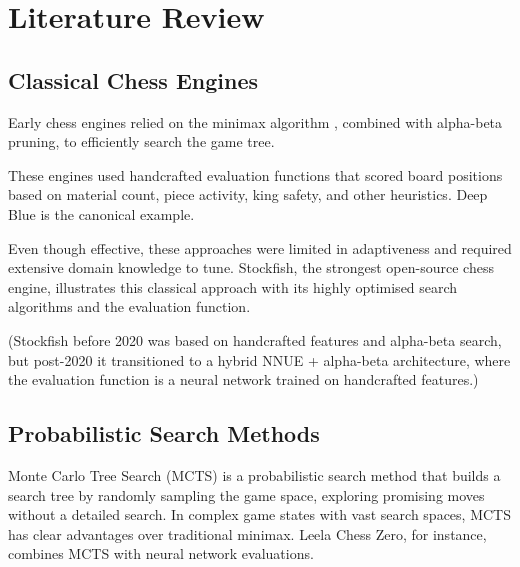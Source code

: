 \chapter{Literature Review}

\section{Classical Chess Engines}

Early chess engines relied on the minimax algorithm \cite{calderan_minimax_chess}, combined with alpha-beta pruning, to efficiently search the game tree.

These engines used handcrafted evaluation functions that scored board positions based on material count, piece activity, king safety, and other heuristics. Deep Blue \cite{deep_blue_paper} is the canonical example.

Even though effective, these approaches were limited in adaptiveness and required extensive domain knowledge to tune. Stockfish, the strongest open-source chess engine, illustrates this classical approach with its highly optimised search algorithms and the evaluation function.

(Stockfish before 2020 was based on handcrafted features and alpha-beta search, but post-2020 it transitioned to a hybrid NNUE + alpha-beta architecture, where the evaluation function is a neural network trained on handcrafted features.)


\section{Probabilistic Search Methods}

Monte Carlo Tree Search (MCTS) \cite{mcts} \cite{mcts_chess} is a probabilistic search method that builds a search tree by randomly sampling the game space, exploring promising moves without a detailed search. In complex game states with vast search spaces, MCTS has clear advantages over traditional minimax. Leela Chess Zero, for instance, combines MCTS with neural network evaluations.

